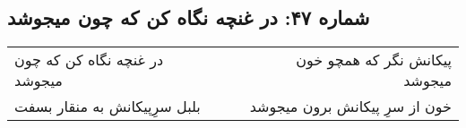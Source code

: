 \begin{center}
\section*{شماره ۴۷: در غنچه نگاه کن که چون میجوشد}
\label{sec:047}
\begin{longtable}{l p{0.5cm} r}
در غنچه نگاه کن که چون میجوشد
&&
پیکانش نگر که همچو خون میجوشد
\\
بلبل سرِپیکانش به منقار بسفت
&&
خون از سرِ پیکانش برون میجوشد
\\
\end{longtable}
\end{center}

